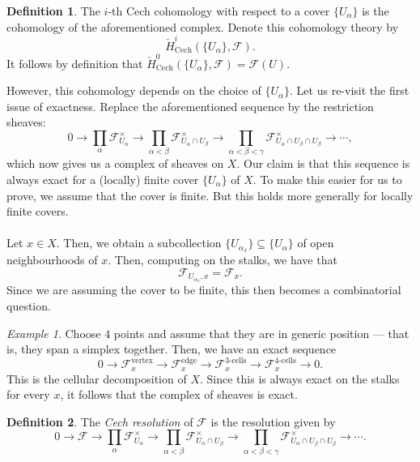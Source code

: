 \documentclass[a4paper]{report}
\theoremstyle{definition}
\newtheorem{definition}{Definition}
\theoremstyle{remark}
\theoremstyle{proposition}
\theoremstyle{conjecture}
\theoremstyle{lemma}
\theoremstyle{corollary}
\theoremstyle{exercise}
\theoremstyle{example}
\newtheorem{example}{Example}
\newcommand{\mcal}{\mathcal}
\newcommand{\on}{\operatorname}
\begin{document}
\begin{definition}
    The $i$-th Cech cohomology with respect to a cover $\lbrace U_\alpha\rbrace$
    is the cohomology of the aforementioned complex. Denote this 
    cohomology theory by 
    $$\check{H}_{\on{Cech}}^i(\lbrace U_\alpha\rbrace,\mcal{F}).$$
    It follows by definition that 
    $\check{H}^0_{\on{Cech}}(\lbrace U_\alpha\rbrace,\mcal{F}) = \mcal{F}(U)$.
\end{definition}

However, this cohomology depends on the choice of $\lbrace U_\alpha\rbrace$.
Let us re-visit the first issue of exactness. 
Replace the aforementioned sequence by the restriction sheaves:
$$0\longrightarrow \prod_\alpha \mcal{F}^\times_{U_\alpha} \longrightarrow \prod_{\alpha< \beta} \mcal{F}^\times_{U_\alpha \cap U_\beta} \longrightarrow \prod_{\alpha<\beta<\gamma}\mcal{F}^\times_{U_\alpha \cap U_\beta \cap U_\beta}\longrightarrow\cdots,$$
which now gives us a complex of sheaves on $X$. Our claim is that this 
sequence is always exact for a (locally) finite cover $\lbrace U_\alpha\rbrace$
of $X$. To make this easier for us to prove, we assume that the cover is finite.
But this holds more generally for locally finite covers.\\\\
Let $x \in X$. Then, we obtain a subcollection $\lbrace U_{\alpha_x}\rbrace \subseteq \lbrace U_\alpha\rbrace$ of open neighbourhoods of $x$. Then,
computing on the stalks, we have that 
$$\mcal{F}_{U_{\alpha_x},x} = \mcal{F}_x.$$
Since we are assuming the cover to be finite, this then becomes a 
combinatorial question.
\begin{example}
    Choose $4$ points and assume that they are in generic
    position --- that is, they span a simplex together.
    Then, we have an exact sequence 
    $$0 \longrightarrow \mcal{F}_x^{\on{vertex}} \longrightarrow \mcal{F}_x^{\on{edge}} \longrightarrow \mcal{F}_x^{\text{$3$-cells}} \longrightarrow \mcal{F}_x^{\text{$4$-cells}} \longrightarrow 0.$$
    This is the cellular decomposition of $X$. Since this is always 
    exact on the stalks for every $x$, it follows that the complex of sheaves
    is exact.
\end{example}

\begin{definition}
    The \emph{Cech resolution} of $\mcal{F}$ is the resolution given by 
    $$0\longrightarrow \mcal{F}\longrightarrow\prod_\alpha \mcal{F}^\times_{U_\alpha} \longrightarrow \prod_{\alpha< \beta} \mcal{F}^\times_{U_\alpha \cap U_\beta} \longrightarrow \prod_{\alpha<\beta<\gamma}\mcal{F}^\times_{U_\alpha \cap U_\beta \cap U_\beta}\longrightarrow\cdots.$$
\end{definition}
\end{document}
